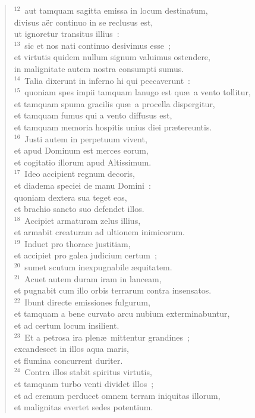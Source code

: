 \begin{verse}
${}^{12}$~aut tamquam sagitta emissa in locum destinatum,\\ divisus a\"er continuo in se reclusus est,\\ ut ignoretur transitus illius~:\\
${}^{13}$~sic et nos nati continuo desivimus esse~;\\ et virtutis quidem nullum signum valuimus ostendere,\\ in malignitate autem nostra consumpti sumus.\\
${}^{14}$~Talia dixerunt in inferno hi qui peccaverunt~:\\
${}^{15}$~quoniam spes impii tamquam lanugo est qu\ae\ a vento tollitur,\\ et tamquam spuma gracilis qu\ae\ a procella dispergitur,\\ et tamquam fumus qui a vento diffusus est,\\ et tamquam memoria hospitis unius diei pr\ae tereuntis.\\
${}^{16}$~Justi autem in perpetuum vivent,\\ et apud Dominum est merces eorum,\\ et cogitatio illorum apud Altissimum.\\
${}^{17}$~Ideo accipient regnum decoris,\\ et diadema speciei de manu Domini~:\\ quoniam dextera sua teget eos,\\ et brachio sancto suo defendet illos.\\
${}^{18}$~Accipiet armaturam zelus illius,\\ et armabit creaturam ad ultionem inimicorum.\\
${}^{19}$~Induet pro thorace justitiam,\\ et accipiet pro galea judicium certum~;\\
${}^{20}$~sumet scutum inexpugnabile \ae quitatem.\\
${}^{21}$~Acuet autem duram iram in lanceam,\\ et pugnabit cum illo orbis terrarum contra insensatos.\\
${}^{22}$~Ibunt directe emissiones fulgurum,\\ et tamquam a bene curvato arcu nubium exterminabuntur,\\ et ad certum locum insilient.\\
${}^{23}$~Et a petrosa ira plen\ae\ mittentur grandines~;\\ excandescet in illos aqua maris,\\ et flumina concurrent duriter.\\
${}^{24}$~Contra illos stabit spiritus virtutis,\\ et tamquam turbo venti dividet illos~;\\ et ad eremum perducet omnem terram iniquitas illorum,\\ et malignitas evertet sedes potentium.\end{verse}


